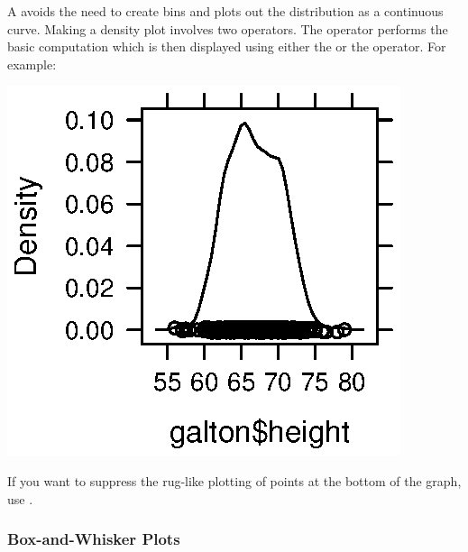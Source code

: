 A  avoids the need to create bins and plots out
the distribution as a continuous curve.  Making a density plot
involves two operators.  The  operator performs the
basic computation which is then displayed using either the 
or the  operator.  For example:
\begin{Schunk}
\end{Schunk}
\includegraphics{Figures/variation-var5-density}

If you want to suppress the rug-like plotting of points at the bottom
of the graph, use . %

\subsubsection{Box-and-Whisker Plots}

